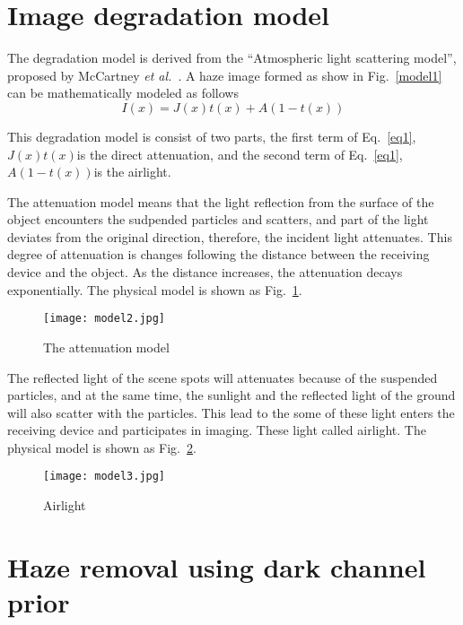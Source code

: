 \documentclass[10pt,twocolumn,letterpaper]{article}
\begin{document}
\section{Image degradation model}
 \par The degradation model is derived from the “Atmospheric light scattering model”, proposed by McCartney \emph{et al.}~\cite{Mccartney1976Optics}. A haze image formed as show in Fig.~\ref{model1} can be mathematically modeled as follows
\begin{equation}
I(x)=J(x)t(x)+A(1-t(x)) \label{eq1}
\end{equation}
\par This degradation model is consist of two parts, the first term of Eq.~\ref{eq1}, $J(x)t(x)$is the direct attenuation, and the second term of Eq.~\ref{eq1}, $A(1-t(x))$is the airlight.
\par The attenuation model means that the light reflection from the surface of the object encounters the sudpended particles and scatters, and part of the light deviates from the original direction, therefore, the incident light attenuates. This degree of attenuation is changes following the distance between the receiving device and the object. As the distance increases, the attenuation decays exponentially. The physical model is shown as Fig.~\ref{model2}.
\begin{figure}[htbp]
 \centering{}
\texttt{[image: model2.jpg]}\\
 \caption{The attenuation model}
\label{model2}
\end{figure}
\par The reflected light of the scene spots will attenuates because of the suspended particles, and at the same time, the sunlight and the reflected light of the ground will also scatter with the particles. This lead to the some of these light enters the receiving device and participates in imaging. These light called airlight. The physical model is shown as Fig.~\ref{model3}.  
\begin{figure}[htbp]
 \centering{}
\texttt{[image: model3.jpg]}\\
 \caption{Airlight}
\label{model3}
\end{figure} 

\section{Haze removal using dark channel prior}
\end{document}
